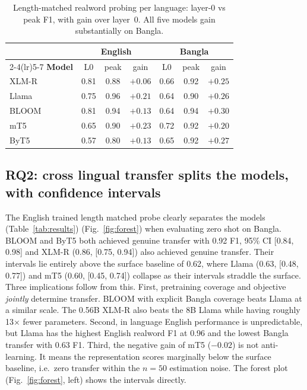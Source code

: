 \documentclass[preprint,12pt,authoryear]{elsarticle}
\begin{document}
\begin{table}[H]
\caption{Length-matched realword probing per language: layer-0 vs peak F1, with gain over layer~0. All five models gain substantially on Bangla.}
\label{tab:realword}
\centering
\small
\setlength{\tabcolsep}{4pt}
\begin{tabular}{lcccccc}
\toprule
& \multicolumn{3}{c}{\textbf{English}} & \multicolumn{3}{c}{\textbf{Bangla}} \\
\cmidrule(lr){2-4}\cmidrule(lr){5-7}
\textbf{Model} & L0 & peak & gain & L0 & peak & gain \\
\midrule
XLM-R & 0.81 & 0.88 & $+0.06$ & 0.66 & 0.92 & $+0.25$ \\
Llama & 0.75 & 0.96 & $+0.21$ & 0.64 & 0.90 & $+0.26$ \\
BLOOM & 0.81 & 0.94 & $+0.13$ & 0.64 & 0.94 & $+0.30$ \\
mT5   & 0.65 & 0.90 & $+0.23$ & 0.72 & 0.92 & $+0.20$ \\
ByT5  & 0.57 & 0.80 & $+0.13$ & 0.65 & 0.92 & $+0.27$ \\
\bottomrule
\end{tabular}
\end{table}

\subsection{RQ2: cross lingual transfer splits the models, with confidence intervals}
The English trained length matched probe clearly separates the models (Table~\ref{tab:results}) (Fig.~\ref{fig:forest}) when evaluating zero shot on Bangla. BLOOM and ByT5 both achieved genuine transfer with 0.92 F1, 95\% CI [0.84, 0.98] and XLM-R (0.86, [0.75, 0.94]) also achieved genuine transfer. Their intervals lie entirely above the surface baseline of 0.62, where Llama (0.63, [0.48, 0.77]) and mT5 (0.60, [0.45, 0.74]) collapse as their intervals straddle the surface. Three implications follow from this. First, pretraining coverage and objective \emph{jointly} determine transfer. BLOOM with explicit Bangla coverage beats Llama at a similar scale. The 0.56B XLM-R also beats the 8B Llama while having roughly 13$\times$ fewer parameters. Second, in language English performance is unpredictable, but Llama has the highest English realword F1 at 0.96 and the lowest Bangla transfer with 0.63 F1. Third, the negative gain of mT5 ($-0.02$) is not anti-learning. It means the representation scores marginally below the surface baseline, i.e.\ zero transfer within the $n = 50$ estimation noise. The forest plot (Fig.~\ref{fig:forest}, left) shows the intervals directly.
\end{document}
